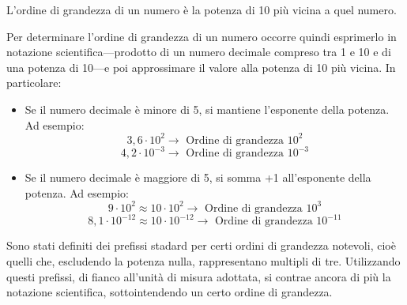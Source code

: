 \vspace{8pt}
\begin{tcolorbox}[colback = yellow!30, colframe = yellow!30!black, title = {Ordine di grandezza}]
L'ordine di grandezza di un numero è la potenza di 10 più vicina a quel numero.
\end{tcolorbox}
\vspace{5pt}

\noindent Per determinare l'ordine di grandezza di un numero occorre quindi esprimerlo in
notazione scientifica—prodotto di un numero decimale compreso tra 1 e 10 e di
una potenza di 10—e poi approssimare il valore alla potenza di 10 più vicina.
In particolare:
\begin{itemize}
    \item Se il numero decimale è minore di 5, si mantiene l'esponente della
    potenza. Ad esempio:
    \[ 3,6 \cdot 10^2 \to \text{ Ordine di grandezza } 10^2 \]
    \[ 4,2 \cdot 10^{-3} \to \text{ Ordine di grandezza } 10^{-3} \]

    \item Se il numero decimale è maggiore di 5, si somma +1 all'esponente della
    potenza. Ad esempio:
    \[ 9 \cdot 10^2 \approx 10 \cdot 10^2 \to \text{ Ordine di grandezza } 10^3 \]
    \[ 8,1 \cdot 10^{-12} \approx 10 \cdot 10^{-12} \to \text{ Ordine di grandezza } 10^{-11} \]
\end{itemize}

\noindent Sono stati definiti dei prefissi stadard per certi ordini di grandezza notevoli,
cioè quelli che, escludendo la potenza nulla, rappresentano multipli di tre.
Utilizzando questi prefissi, di fianco all'unità di misura adottata, si contrae
ancora di più la notazione scientifica, sottointendendo un certo ordine di
grandezza.